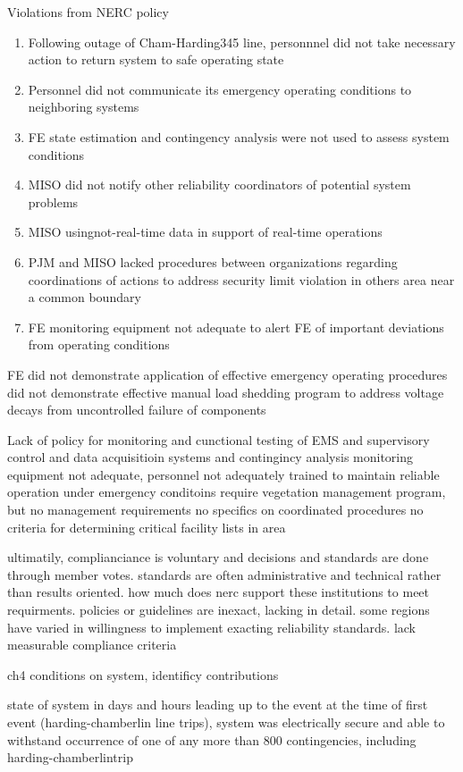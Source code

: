 Violations from NERC policy
\begin{enumerate}
\item Following outage of Cham-Harding345 line, personnnel did not take necessary action to return system to safe operating state
\item Personnel did not communicate its emergency operating conditions to neighboring systems
\item FE state estimation and contingency analysis were not used to assess system conditions
\item MISO did not notify other reliability coordinators of potential system problems
\item MISO usingnot-real-time data in support of real-time operations
\item PJM and MISO lacked procedures between organizations regarding coordinations of actions to address security limit violation in others area near a common boundary
\item FE monitoring equipment not adequate to alert FE of important deviations from operating conditions
\end{enumerate}

FE 
did not demonstrate application of effective emergency operating procedures
did not demonstrate effective manual load shedding program to address voltage decays from uncontrolled failure of components

Lack of policy for
monitoring and cunctional testing of EMS and supervisory control and data acquisitioin systems and contingincy analysis
monitoring equipment not adequate, personnel not adequately trained to maintain reliable operation under emergency conditoins
require vegetation management program, but no management requirements
no specifics on coordinated procedures
no criteria for determining critical facility lists in area

ultimatily, complianciance is voluntary and decisions and standards are done through member votes.   standards are often administrative and technical rather than results oriented.  how much does nerc support these institutions to meet requirments.  policies or guidelines are inexact, lacking in detail. some regions have varied in willingness to implement exacting reliability standards. lack measurable compliance criteria


ch4 conditions on system, identificy contributions 

state of system in days and hours leading up to the event
at the time of first event (harding-chamberlin line trips), system was electrically secure and able to withstand occurrence of one of any more than 800 contingencies, including harding-chamberlintrip

